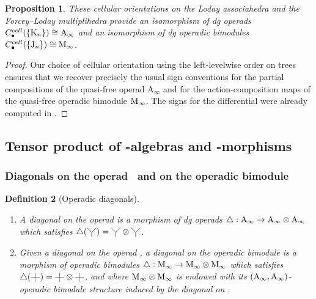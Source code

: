 \documentclass[twoside, 11pt]{amsart}
\newtheorem{definition}{Definition}[section]
\newtheorem{proposition}[definition]{Proposition}
\theoremstyle{remark}
\begin{document}
\begin{proposition} 
\label{prop:cellular-chains}
These cellular orientations on the Loday associahedra and the Forcey--Loday multiplihedra provide an isomorphism of dg operads $C_\bullet^{cell}(\{\mathrm{K}_n\})\cong \mathrm{A}_\infty$ and an isomorphism of dg operadic bimodules $C_\bullet^{cell}(\{\mathrm{J}_n\})\cong \mathrm{M}_\infty$. 
\end{proposition}

\begin{proof}
Our choice of cellular orientation using the left-levelwise order on trees ensures that we recover precisely the usual sign conventions for the partial compositions of the quasi-free operad $\mathrm{A}_\infty$ and for the action-composition maps of the quasi-free operadic bimodule $\mathrm{M}_\infty$. 
The signs for the differential were already computed in \cite[Section 1.4]{mazuir-I}.
\end{proof}

\subsection{Tensor product of \Ainf -algebras and \Ainf -morphisms}

\subsubsection{Diagonals on the operad \Ainf\ and on the operadic bimodule \Minf}

\begin{definition}[Operadic diagonals]
\begin{enumerate}[leftmargin=*]
    \item A \emph{diagonal on the operad \Ainf} is a morphism of dg operads $\triangle : \mathrm{A}_\infty \rightarrow \mathrm{A}_\infty \otimes \mathrm{A}_\infty$ which satisfies $\triangle (\arbreopdeux) = \arbreopdeux \otimes \arbreopdeux$. 
    \item Given a diagonal on the operad \Ainf, a \emph{diagonal on the operadic bimodule \Minf} is a morphism of operadic bimodules $\triangle : \mathrm{M}_\infty \rightarrow \mathrm{M}_\infty \otimes \mathrm{M}_\infty$ which satisfies $\triangle ( \arbreopunmorph ) = \arbreopunmorph \otimes \arbreopunmorph$, and where $\mathrm{M}_\infty \otimes \mathrm{M}_\infty$ is endowed with its $(\mathrm{A}_\infty , \mathrm{A}_\infty)$-operadic bimodule structure induced by the diagonal on \Ainf .
\end{enumerate}
\end{definition}
\end{document}
